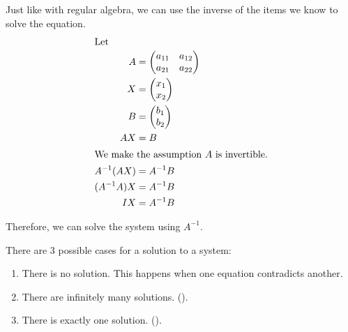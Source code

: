 \begin{blackbox}
  Just like with regular algebra, we can use the inverse of the items we know to solve the equation.
  \begin{align*}
    \intertext{Let}
    A &=
        \begin{pmatrix}
          a_{11} & a_{12} \\
          a_{21} & a_{22}
        \end{pmatrix} \\
    X &=
        \begin{pmatrix}
          x_{1} \\
          x_{2}
        \end{pmatrix} \\
    B &=
        \begin{pmatrix}
          b_{1} \\
          b_{2}
        \end{pmatrix} \\
    AX &= B \\
    \shortintertext{We make the assumption $A$ is invertible.}
    A^{-1} (A X) &= A^{-1} B \\
    (A^{-1} A) X &= A^{-1} B \\
    I X &= A^{-1} B
  \end{align*}

  Therefore, we can solve the system using $A^{-1}$.
\end{blackbox}

There are 3 possible cases for a solution to a system:
\begin{enumerate}[noitemsep]
\item There is no solution. This happens when one equation contradicts another.
\item There are infinitely many solutions. ().
\item There is exactly one solution. ().
\end{enumerate}


